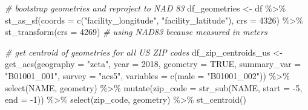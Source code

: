 \documentclass[
]{book}
\newenvironment{Shaded}{\begin{snugshade}}{\end{snugshade}}
\newcommand{\AttributeTok}[1]{\textcolor[rgb]{0.77,0.63,0.00}{#1}}
\newcommand{\CommentTok}[1]{\textcolor[rgb]{0.56,0.35,0.01}{\textit{#1}}}
\newcommand{\ConstantTok}[1]{\textcolor[rgb]{0.00,0.00,0.00}{#1}}
\newcommand{\DecValTok}[1]{\textcolor[rgb]{0.00,0.00,0.81}{#1}}
\newcommand{\FunctionTok}[1]{\textcolor[rgb]{0.00,0.00,0.00}{#1}}
\newcommand{\NormalTok}[1]{#1}
\newcommand{\OtherTok}[1]{\textcolor[rgb]{0.56,0.35,0.01}{#1}}
\newcommand{\SpecialCharTok}[1]{\textcolor[rgb]{0.00,0.00,0.00}{#1}}
\newcommand{\StringTok}[1]{\textcolor[rgb]{0.31,0.60,0.02}{#1}}
\begin{document}
\begin{Shaded}
\begin{Highlighting}[]
\CommentTok{\# bootstrap geometries and reproject to NAD 83}
\NormalTok{df\_geometries }\OtherTok{\textless{}{-}}\NormalTok{ df }\SpecialCharTok{\%\textgreater{}\%} 
  \FunctionTok{st\_as\_sf}\NormalTok{(}\AttributeTok{coords =} \FunctionTok{c}\NormalTok{(}\StringTok{"facility\_longitude"}\NormalTok{, }\StringTok{"facility\_latitude"}\NormalTok{),}
           \AttributeTok{crs =} \DecValTok{4326}\NormalTok{) }\SpecialCharTok{\%\textgreater{}\%} 
  \FunctionTok{st\_transform}\NormalTok{(}\AttributeTok{crs =} \DecValTok{4269}\NormalTok{) }\CommentTok{\# using NAD83 because measured in meters}

\CommentTok{\# get centroid of geometries for all US ZIP codes }
\NormalTok{df\_zip\_centroids\_us }\OtherTok{\textless{}{-}} \FunctionTok{get\_acs}\NormalTok{(}\AttributeTok{geography =} \StringTok{"zcta"}\NormalTok{, }\AttributeTok{year =} \DecValTok{2018}\NormalTok{, }\AttributeTok{geometry =} \ConstantTok{TRUE}\NormalTok{, }
                               \AttributeTok{summary\_var =} \StringTok{"B01001\_001"}\NormalTok{,}
                               \AttributeTok{survey =} \StringTok{"acs5"}\NormalTok{,}
                               \AttributeTok{variables =} \FunctionTok{c}\NormalTok{(}\AttributeTok{male =} \StringTok{"B01001\_002"}\NormalTok{)) }\SpecialCharTok{\%\textgreater{}\%} 
  \FunctionTok{select}\NormalTok{(NAME, geometry) }\SpecialCharTok{\%\textgreater{}\%} 
  \FunctionTok{mutate}\NormalTok{(}\AttributeTok{zip\_code =} \FunctionTok{str\_sub}\NormalTok{(NAME, }\AttributeTok{start =} \SpecialCharTok{{-}}\DecValTok{5}\NormalTok{, }\AttributeTok{end =} \SpecialCharTok{{-}}\DecValTok{1}\NormalTok{)) }\SpecialCharTok{\%\textgreater{}\%} 
  \FunctionTok{select}\NormalTok{(zip\_code, geometry) }\SpecialCharTok{\%\textgreater{}\%} 
  \FunctionTok{st\_centroid}\NormalTok{()}


\end{Highlighting}
\end{Shaded}
\end{document}
